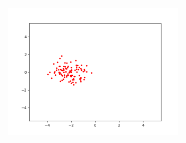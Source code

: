 \documentclass[a4paper]{article}
\theoremstyle{definition}
\newenvironment{soln}{
	\leavevmode\color{blue}\ignorespaces
}{}
\begin{document}
\begin{enumerate}
\begin{soln}
		 \begin{figure}[h!]
		     \centering
		     \includegraphics[width=0.4\textwidth]{secondscatter.png}  
		     \captionsetup{labelformat=empty}
		     \caption{}
		     \label{fig:fig2}
		 \end{figure}
	\end{soln}
	\end{enumerate}
	
	
	
	
	
	
	
\end{document}
